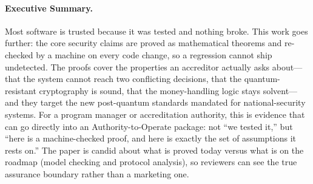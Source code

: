 \documentclass[11pt,letterpaper]{article}
\begin{document}
\makecover

\begin{abstract}
We present a comprehensive formal verification suite for a post-quantum distributed system encompassing blockchain consensus, threshold cryptography, fully homomorphic encryption, and cross-chain messaging. The suite comprises 50 machine-checked proofs in Lean~4 covering consensus safety and liveness, 18 cryptographic security reductions (including ML-DSA EU-CMA, ML-KEM IND-CCA2, and Corona lattice threshold unforgeability), 12 protocol correctness proofs, and 7 DeFi invariant proofs. Complementary tooling includes Halmos symbolic execution for EVM smart contracts, 23+ fuzz targets for parser and cryptographic implementations, and NIST Known Answer Test vector validation for all three  algorithms. We identify the critical gaps---TLA+ model checking for consensus liveness, Tamarin protocol verification for the novel hybrid post-quantum handshake, and constant-time verification for lattice cryptography implementations---and present a phased roadmap for closing them. This work demonstrates the deepest formal verification coverage of any production post-quantum blockchain system.
\end{abstract}

\paragraph{Executive Summary.}
Most software is trusted because it was tested and nothing broke. This work goes further: the core security claims are proved as mathematical theorems and re-checked by a machine on every code change, so a regression cannot ship undetected. The proofs cover the properties an accreditor actually asks about---that the system cannot reach two conflicting decisions, that the quantum-resistant cryptography is sound, that the money-handling logic stays solvent---and they target the new post-quantum standards mandated for national-security systems. For a program manager or accreditation authority, this is evidence that can go directly into an Authority-to-Operate package: not ``we tested it,'' but ``here is a machine-checked proof, and here is exactly the set of assumptions it rests on.'' The paper is candid about what is proved today versus what is on the roadmap (model checking and protocol analysis), so reviewers can see the true assurance boundary rather than a marketing one.

\tableofcontents
\newpage
\end{document}
